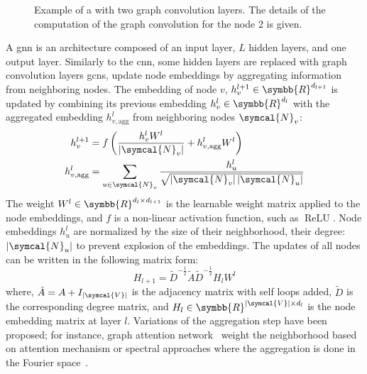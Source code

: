 \documentclass[../main.tex]{subfiles}
\begin{document}
		\begin{figure}[htbp]
			\centering
			\ifSubfilesClassLoaded{%
			}{
			}
			\caption[Example of a ]{Example of a  with two graph convolution layers. The details of the computation of the graph convolution for the node 2 is given. }\label{fig:gnn}
		\end{figure}

		A \gls{gnn} is an architecture composed of an input layer, \(L\) hidden layers, and one output layer.
		Similarly to the \gls{cnn}, some hidden layers are replaced with graph convolution layers
		\Glspl{gcn}, update node embeddings by aggregating information from neighboring nodes.
		The embedding of node \(v\), \(h^{l+1}_{v} \in \symbb{R}^{d_{l+1}}\) is updated by combining its previous embedding \(h^{l}_{v} \in \symbb{R}^{d_{l}}\) with the aggregated embedding \(h^{l}_{v,\text{agg}}\) from neighboring nodes \(\symcal{N}_{v}\):
		\begin{align}
			h^{l+1}_{v}          & = f\left( \frac{h^{l}_{v}W^{l}}{\left|\symcal{N}_{v} \right|} + h^{l}_{v,\text{agg}}W^{l}\right)                \\
			h^{l}_{v,\text{agg}} & = \sum_{u \in \symcal{N}_{v}} \frac{h^{l}_{u}}{\sqrt{\left|\symcal{N}_{v} \right|\left|\symcal{N}_{u} \right|}}
		\end{align}
		The weight \(W^{l} \in \symbb{R}^{d_{l}\times d_{l+1}}\) is the learnable weight matrix applied to the node embeddings, and \(f\) is a non-linear activation function, such as \(\operatorname{ReLU}\).
		Node embeddings \(h_{u}^{l}\) are normalized by the size of their neighborhood, \ie{}their degree: \(\left|\symcal{N}_{u} \right|\) to prevent explosion of the embeddings.
		The updates of all nodes can be written in the following matrix form:
		\begin{equation}
			H_{l+1} = \tilde{D}^{-\tfrac12}\tilde{A}\tilde{D}^{-\tfrac12}H_{l}W^{l}
		\end{equation}
		where, \(\tilde{A} = A + I_{\left|\symcal{V}\right|}\) is the adjacency matrix with self loops added, \(\tilde{D}\) is the corresponding degree matrix, and \(H_{l} \in \symbb{R}^{\left|\symcal{V}\right| \times d_{l}}\) is the node embedding matrix at layer \(l\).
		Variations of the aggregation step have been proposed; for instance, graph attention network~\cite{velickovic2018graph} weight the neighborhood based on attention mechanism or spectral approaches where the aggregation is done in the Fourier space~\cite{ChebConv}.
\end{document}
